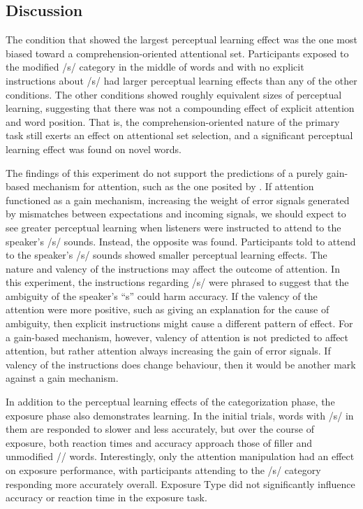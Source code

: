 \subsection{Discussion}

The condition that showed the largest perceptual learning effect was the one most biased toward a comprehension-oriented attentional set.
Participants exposed to the modified /s/ category in the middle of words and with no explicit instructions about /s/ had larger perceptual learning effects than any of the other conditions.
The other conditions showed roughly equivalent sizes of perceptual learning, suggesting that there was not a compounding effect of explicit attention and word position.
That is, the comprehension-oriented nature of the primary task still exerts an effect on attentional set selection, and a significant perceptual learning effect was found on novel words.

The findings of this experiment do not support the predictions of a purely gain-based mechanism for attention, such as the one posited by \citet{Clark2013}.
If attention functioned as a gain mechanism, increasing the weight of error signals generated by mismatches between expectations and incoming signals, we should expect to see greater perceptual learning when listeners were instructed to attend to the speaker's /s/ sounds.
Instead, the opposite was found.
Participants told to attend to the speaker's /s/ sounds showed smaller perceptual learning effects.
The nature and valency of the instructions may affect the outcome of attention.
In this experiment, the instructions regarding /s/ were phrased to suggest that the ambiguity of the speaker's ``s'' could harm accuracy.
If the valency of the attention were more positive, such as giving an explanation for the cause of ambiguity, then explicit instructions might cause a different pattern of effect.
For a gain-based mechanism, however, valency of attention is not predicted to affect attention, but rather attention always increasing the gain of error signals.
If valency of the instructions does change behaviour, then it would be another mark against a gain mechanism.

In addition to the perceptual learning effects of the categorization phase, the exposure phase also demonstrates learning.  
In the initial trials, words with /s/ in them are responded to slower and less accurately, but over the course of exposure, both reaction times and accuracy approach those of filler and unmodified /\textesh/ words.
Interestingly, only the attention manipulation had an effect on exposure performance, with participants attending to the /s/ category responding more accurately overall.
Exposure Type did not significantly influence accuracy or reaction time in the exposure task.


